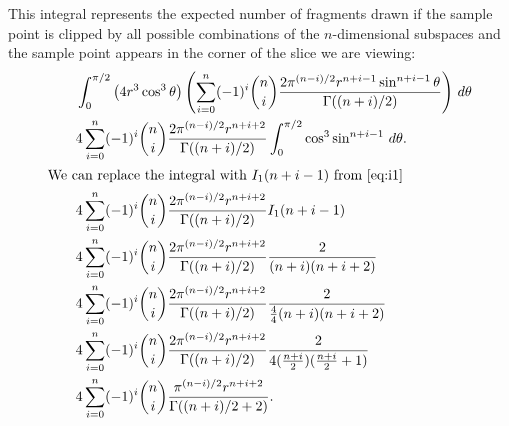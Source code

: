 \begin{lem}

This integral represents the expected number of fragments drawn if the sample
point is clipped by all possible combinations of the $n$-dimensional 
subspaces and the sample point appears in the corner of the slice we are 
viewing:
\begin{align*}
  \qquad & \int_{0}^{\pi/2}
           \left(4r^3 \cos^3 \theta\right)
           \left(\sum_{i=0}^{n} 
           (-1)^i {n \choose i}
           \frac{2\pi^{(n-i)/2} r^{n+i-1} \sin^{n+i-1} \theta}
                {\Gamma((n+i)/2)} \right) \, d\theta \\
  \qquad & 4 \sum_{i=0}^{n} (-1)^i {n \choose i} 
                            \frac{2\pi^{(n-i)/2} r^{n+i+2}}
                                 {\Gamma((n+i)/2)}
           \int_{0}^{\pi/2} \cos^3 \sin^{n+i-1} \, d\theta \text{.} \\
\intertext{We can replace the integral with $I_1(n+i-1)$ from \autoref{eq:i1}}
  \qquad & 4 \sum_{i=0}^{n} (-1)^i {n \choose i}
                            \frac{2\pi^{(n-i)/2} r^{n+i+2}}
                                 {\Gamma((n+i)/2)}
                            I_1(n+i-1) \\
  \qquad & 4 \sum_{i=0}^{n} (-1)^i {n \choose i} 
                            \frac{2\pi^{(n-i)/2} r^{n+i+2}}{\Gamma((n+i)/2)}
                            \frac{2}{(n+i)(n+i+2)} \\
  \qquad & 4 \sum_{i=0}^{n} (-1)^i {n \choose i} 
                            \frac{2\pi^{(n-i)/2} r^{n+i+2}}{\Gamma((n+i)/2)}
                            \frac{2}{\frac{4}{4}(n+i)(n+i+2)} \\
  \qquad & 4 \sum_{i=0}^{n} (-1)^i {n \choose i} 
                            \frac{2\pi^{(n-i)/2} r^{n+i+2}}{\Gamma((n+i)/2)}
                            \frac{2}{4(\frac{n+i}{2})(\frac{n+i}{2}+1)} \\
  \qquad & 4 \sum_{i=0}^{n} (-1)^i {n \choose i} 
                            \frac{\pi^{(n-i)/2} r^{n+i+2}}{\Gamma((n+i)/2 + 2)}
\text{.}
\end{align*}

\end{lem}

